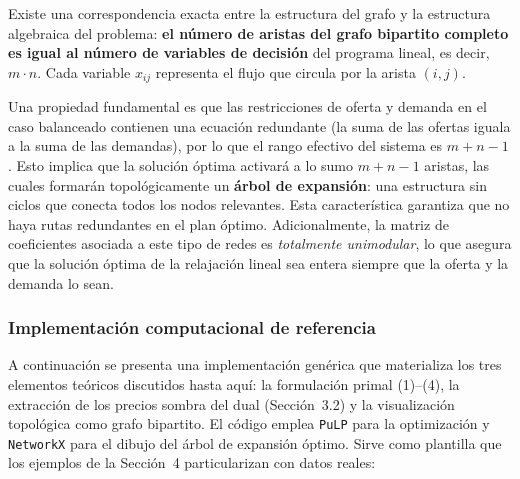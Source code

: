 \documentclass[10pt,letterpaper,twocolumn]{article}
\begin{document}
Existe una correspondencia exacta entre la estructura del grafo y la estructura algebraica del problema: \textbf{el número de aristas del grafo bipartito completo es igual al número de variables de decisión} del programa lineal, es decir, $m\cdot n$. Cada variable $x_{ij}$ representa el flujo que circula por la arista $(i, j)$.

Una propiedad fundamental es que las restricciones de oferta y demanda en el caso balanceado contienen una ecuación redundante (la suma de las ofertas iguala a la suma de las demandas), por lo que el rango efectivo del sistema es $m+n-1$. Esto implica que la solución óptima activará a lo sumo $m+n-1$ aristas, las cuales formarán topológicamente un \textbf{árbol de expansión}: una estructura sin ciclos que conecta todos los nodos relevantes. Esta característica garantiza que no haya rutas redundantes en el plan óptimo. Adicionalmente, la matriz de coeficientes asociada a este tipo de redes es \emph{totalmente unimodular}, lo que asegura que la solución óptima de la relajación lineal sea entera siempre que la oferta y la demanda lo sean.

\subsubsection{Implementación computacional de referencia}
A continuación se presenta una implementación genérica que materializa los tres elementos teóricos discutidos hasta aquí: la formulación primal (1)--(4), la extracción de los precios sombra del dual (Sección~3.2) y la visualización topológica como grafo bipartito. El código emplea \texttt{PuLP} para la optimización y \texttt{NetworkX} para el dibujo del árbol de expansión óptimo. Sirve como plantilla que los ejemplos de la Sección~4 particularizan con datos reales:
\end{document}
